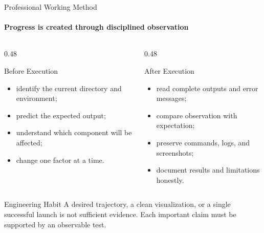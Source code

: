\begin{frame}{Professional Working Method}
\framesubtitle{Progress is created through disciplined observation}
\footnotesize
\begin{columns}[T,onlytextwidth]
    \begin{column}{0.48\textwidth}
        \begin{block}{Before Execution}
            \begin{itemize}
                \setlength{\itemsep}{0.22em}
                \item identify the current directory and environment;
                \item predict the expected output;
                \item understand which component will be affected;
                \item change one factor at a time.
            \end{itemize}
        \end{block}
    \end{column}
    \begin{column}{0.48\textwidth}
        \begin{block}{After Execution}
            \begin{itemize}
                \setlength{\itemsep}{0.22em}
                \item read complete outputs and error messages;
                \item compare observation with expectation;
                \item preserve commands, logs, and screenshots;
                \item document results and limitations honestly.
            \end{itemize}
        \end{block}
    \end{column}
\end{columns}
\begin{alertblock}{Engineering Habit}
A desired trajectory, a clean visualization, or a single successful launch is not sufficient evidence. Each important claim must be supported by an observable test.
\end{alertblock}
\end{frame}

